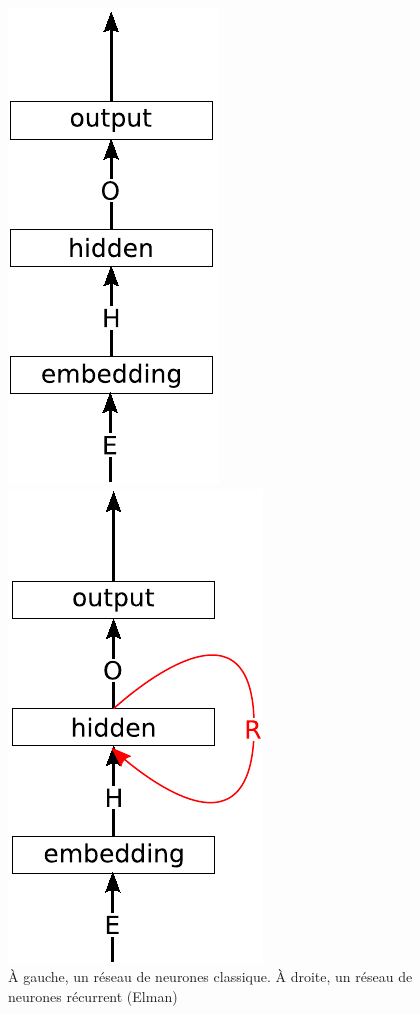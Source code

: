 \documentclass[PhD-Yoann-Dupont.tex]{subfiles}
\begin{document}
\begin{figure}[ht!]
\begin{minipage}{0.49\linewidth}
\centering
\includegraphics[scale=0.75]{images/NN/FFNN}
\end{minipage}
\begin{minipage}{0.49\linewidth}
\centering
\includegraphics[scale=0.75]{images/NN/Elman-RNN}
\end{minipage}
\caption{À gauche, un réseau de neurones classique. À droite, un réseau de neurones récurrent (Elman)}
\label{fig:FFNN-vs-RNN}
\end{figure}
\end{document}
